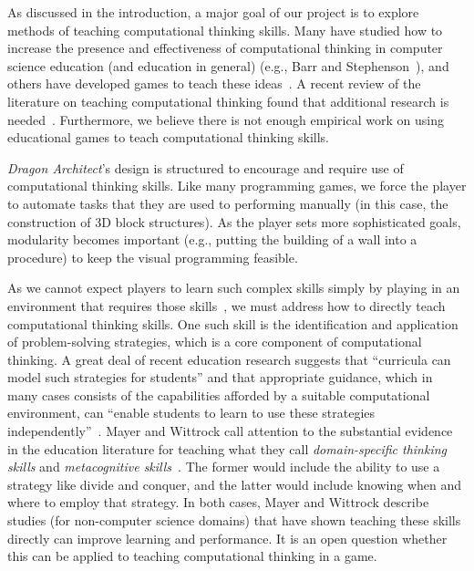 \documentclass{sig-alternate}
\newcommand{\gametitle}{{\emph{Dragon Architect}}}
\begin{document}
As discussed in the introduction, a major goal of our project is to explore methods of teaching computational thinking skills.
Many have studied how to increase the presence and effectiveness of computational thinking in computer science education (and education in general) (e.g., Barr and Stephenson~\cite{barr2011bringing}), and others have developed games to teach these ideas~\cite{weintrop2013robobuilder, kazimoglu2012serious}.
A recent review of the literature on teaching computational thinking found that additional research is needed~\cite{lye2014review}.
Furthermore, we believe there is not enough empirical work on using educational games to teach computational thinking skills. 

\gametitle{}'s design is structured to encourage and require use of computational thinking skills.
Like many programming games, we force the player to automate tasks that they are used to performing manually (in this case, the construction of 3D block structures).
As the player sets more sophisticated goals, modularity becomes important (e.g., putting the building of a wall into a procedure) to keep the visual programming feasible. 

As we cannot expect players to learn such complex skills simply by playing in an environment that requires those skills~\cite{mayer2004should}, we must address how to directly teach computational thinking skills.
One such skill is the identification and application of problem-solving strategies, which is a core component of computational thinking.
A great deal of recent education research suggests that ``curricula can model such strategies for students'' and that appropriate guidance, which in many cases consists of the capabilities afforded by a suitable computational environment, can ``enable students to learn to use these strategies independently''~\cite{report2010computational}.
Mayer and Wittrock call attention to the substantial evidence in the education literature for teaching what they call \emph{domain-specific thinking skills} and \emph{metacognitive skills}~\cite{mayer1996handbook}.
The former would include the ability to use a strategy like divide and conquer, and the latter would include knowing when and where to employ that strategy.
In both cases, Mayer and Wittrock describe studies (for non-computer science domains) that have shown teaching these skills directly can improve learning and performance. It is an open question whether this can be applied to teaching computational thinking in a game.
\end{document}
